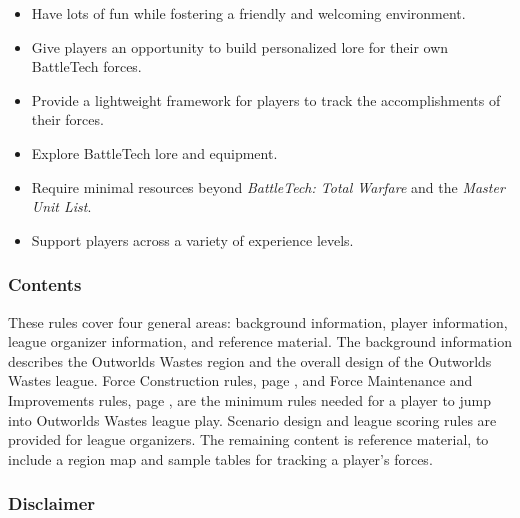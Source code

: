 \documentclass{article}
\begin{document}
\begin{itemize}

\item Have lots of fun while fostering a friendly and welcoming environment.

\item Give players an opportunity to build personalized lore for their own BattleTech forces.

\item Provide a lightweight framework for players to track the accomplishments of their forces.

\item Explore BattleTech lore and equipment.

\item Require minimal resources beyond \emph{BattleTech: Total Warfare} and the \emph{Master Unit List}.

\item Support players across a variety of experience levels.

\end{itemize}

\subsubsection*{Contents}

These rules cover four general areas: background information, player information, league organizer information, and reference material.
The background information describes the Outworlds Wastes region and the overall design of the Outworlds Wastes league.
Force Construction rules, page \pageref{subsec:force_construction}, and Force Maintenance and Improvements rules, page \pageref{subsec:force_maintenance}, are the minimum rules needed for a player to jump into Outworlds Wastes league play.
Scenario design and league scoring rules are provided for league organizers.
The remaining content is reference material, to include a region map and sample tables for tracking a player's forces.

\subsubsection*{Disclaimer}
\end{document}
